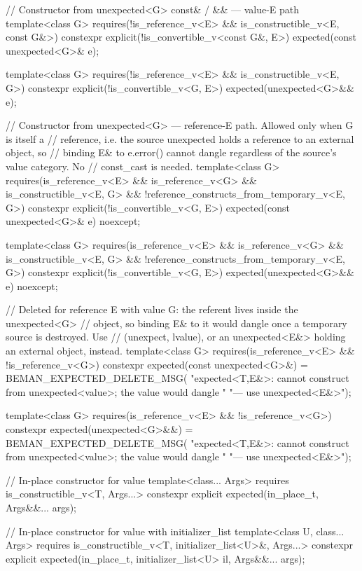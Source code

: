 \begin{codeblock}
{  // Constructor from unexpected<G> const& / && — value-E path
  template<class G>
    requires(!is_reference_v<E> && is_constructible_v<E, const G&>)
  constexpr explicit(!is_convertible_v<const G&, E>) expected(const unexpected<G>& e);

  template<class G>
    requires(!is_reference_v<E> && is_constructible_v<E, G>)
  constexpr explicit(!is_convertible_v<G, E>) expected(unexpected<G>&& e);

  // Constructor from unexpected<G> — reference-E path. Allowed only when G is itself a
  // reference, i.e. the source unexpected holds a reference to an external object, so
  // binding E& to e.error() cannot dangle regardless of the source's value category. No
  // const_cast is needed.
  template<class G>
    requires(is_reference_v<E> && is_reference_v<G> && is_constructible_v<E, G> &&
             !reference_constructs_from_temporary_v<E, G>)
  constexpr explicit(!is_convertible_v<G, E>) expected(const unexpected<G>& e) noexcept;

  template<class G>
    requires(is_reference_v<E> && is_reference_v<G> && is_constructible_v<E, G> &&
             !reference_constructs_from_temporary_v<E, G>)
  constexpr explicit(!is_convertible_v<G, E>) expected(unexpected<G>&& e) noexcept;

  // Deleted for reference E with value G: the referent lives inside the unexpected<G>
  // object, so binding E& to it would dangle once a temporary source is destroyed. Use
  // (unexpect, lvalue), or an unexpected<E&> holding an external object, instead.
  template<class G>
    requires(is_reference_v<E> && !is_reference_v<G>)
  constexpr expected(const unexpected<G>&) = BEMAN_EXPECTED_DELETE_MSG(
      "expected<T,E&>: cannot construct from unexpected<value>; the value would dangle "
      "— use unexpected<E&>");

  template<class G>
    requires(is_reference_v<E> && !is_reference_v<G>)
  constexpr expected(unexpected<G>&&) = BEMAN_EXPECTED_DELETE_MSG(
      "expected<T,E&>: cannot construct from unexpected<value>; the value would dangle "
      "— use unexpected<E&>");

  // In-place constructor for value
  template<class... Args>
    requires is_constructible_v<T, Args...>
  constexpr explicit expected(in_place_t, Args&&... args);

  // In-place constructor for value with initializer_list
  template<class U, class... Args>
    requires is_constructible_v<T, initializer_list<U>&, Args...>
  constexpr explicit expected(in_place_t, initializer_list<U> il, Args&&... args);

}
\end{codeblock}
